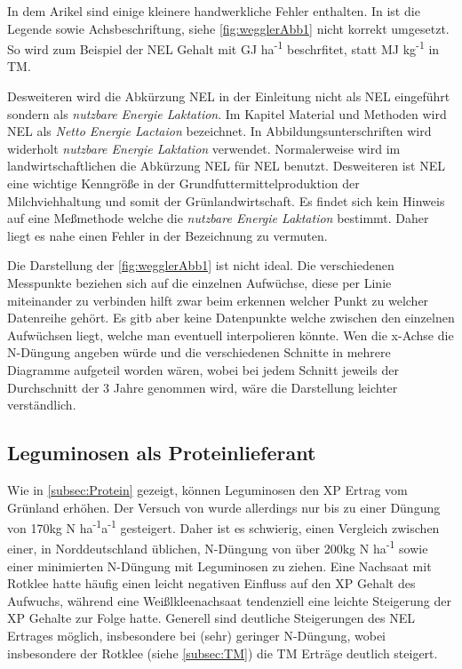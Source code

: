 In dem Arikel \parencite[33-36]{weggler2050leguminosen} sind einige kleinere handwerkliche Fehler enthalten.
In \textcite[35]{weggler2050leguminosen} ist die Legende sowie Achsbeschriftung, siehe \cref{fig:wegglerAbb1} nicht korrekt umgesetzt.
So wird zum Beispiel der \ac{NEL} Gehalt mit GJ ha\textsuperscript{-1} beschrfitet, statt MJ kg\textsuperscript{-1} in \ac{TM}.

Desweiteren wird die Abkürzung \ac{NEL} in der Einleitung nicht als \acl{NEL} eingeführt sondern als \textit{nutzbare Energie Laktation}.
Im Kapitel Material und Methoden wird \ac{NEL} als \textit{Netto Energie Lactaion} bezeichnet.
In Abbildungsunterschriften wird widerholt \textit{nutzbare Energie Laktation} verwendet.
Normalerweise wird im landwirtschaftlichen die Abkürzung \acs{NEL} für \acl{NEL} benutzt.
Desweiteren ist \ac{NEL} eine wichtige Kenngröße in der Grundfuttermittelproduktion der Milchviehhaltung und somit der Grünlandwirtschaft.
Es findet sich kein Hinweis auf eine Meßmethode welche die \textit{nutzbare Energie Laktation} bestimmt.
Daher liegt es nahe einen Fehler in der Bezeichnung zu vermuten.

Die Darstellung der \cref{fig:wegglerAbb1} ist nicht ideal.
Die verschiedenen Messpunkte beziehen sich auf die einzelnen Aufwüchse, diese per Linie miteinander zu verbinden hilft zwar beim erkennen welcher Punkt zu welcher Datenreihe gehört.
Es gitb aber keine Datenpunkte welche zwischen den einzelnen Aufwüchsen liegt, welche man eventuell interpolieren könnte.
Wen die x-Achse die N-Düngung angeben würde und die verschiedenen Schnitte in mehrere Diagramme aufgeteil worden wären, wobei bei jedem Schnitt jeweils der Durchschnitt der 3 Jahre genommen wird, wäre die Darstellung leichter verständlich.


\subsection{Leguminosen als Proteinlieferant}
\label{sub:leguminosen}
Wie in \ref{subsec:Protein} gezeigt, können Leguminosen den \ac{XP} Ertrag vom Grünland erhöhen.
Der Versuch von \textcite[33-36]{weggler2050leguminosen} wurde allerdings nur bis zu einer Düngung von 170kg N ha\textsuperscript{-1}a\textsuperscript{-1} gesteigert.
Daher ist es schwierig, einen Vergleich zwischen einer, in Norddeutschland üblichen, N-Düngung von über 200kg N ha\textsuperscript{-1} sowie einer minimierten N-Düngung mit Leguminosen zu ziehen.
Eine Nachsaat mit Rotklee hatte häufig einen leicht negativen Einfluss auf den \ac{XP} Gehalt des Aufwuchs, während eine Weißlkleenachsaat tendenziell eine leichte Steigerung der \ac{XP} Gehalte zur Folge hatte.
Generell sind deutliche Steigerungen des \ac{NEL} Ertrages möglich, insbesondere bei (sehr) geringer N-Düngung, wobei insbesondere der Rotklee (siehe \ref{subsec:TM}) die \ac{TM} Erträge deutlich steigert.

